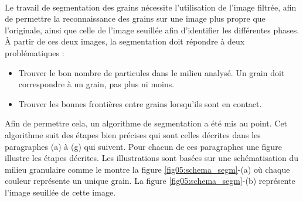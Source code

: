 	\paragraph{}
	Le travail de segmentation des grains nécessite l'utilisation de l'image filtrée, afin de permettre la reconnaissance des grains sur une image plus propre que l'originale, ainsi que celle de l'image seuillée afin d'identifier les différentes phases. \`A partir de ces deux images, la segmentation doit répondre à deux problématiques :
	\begin{itemize}
		\item Trouver le bon nombre de particules dans le milieu analysé. Un grain doit correspondre à un grain, pas plus ni moins.
		\item Trouver les bonnes frontières entre grains lorsqu'ils sont en contact.
	\end{itemize}
	Afin de permettre cela, un algorithme de segmentation a été mis au point. Cet algorithme suit des étapes bien précises qui sont celles décrites dans les paragraphes (a) à (g) qui suivent. Pour chacun de ces paragraphes une figure illustre les étapes décrites. Les illustrations sont basées sur une schématisation du milieu granulaire comme le montre la figure \ref{fig05:schema_segm}-(a) où chaque couleur représente un unique grain. La figure \ref{fig05:schema_segm}-(b) représente l'image seuillée de cette image.
